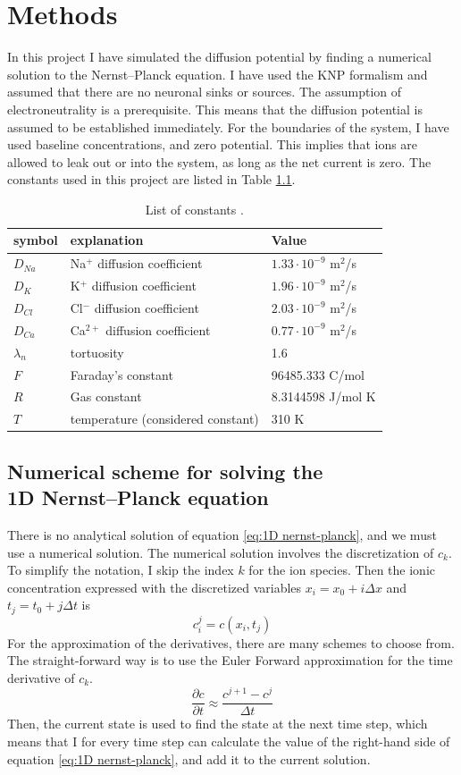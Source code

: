 \documentclass{uiophd}
\begin{document}
\chapter{Methods}
In this project I have  simulated the diffusion potential by finding a numerical solution to the Nernst--Planck equation. I have used the KNP formalism and assumed that there are no neuronal sinks or sources. The assumption of electroneutrality is a prerequisite. This means that the diffusion potential is assumed to be established immediately. For the boundaries of the system, I have used baseline concentrations, and zero potential. This implies that ions are allowed to leak out or into the system, as long as the net current is zero. The constants used in this project are listed in Table \ref{tab:constants}.
\begin{table}[h!]
  \centering
  \caption{List of constants \cite{Halnes2016}.}
  \label{tab:constants}
  \begin{tabular}{l||l|l}
symbol & explanation & Value \\
\hline
$D_{Na}$  & Na$^+$ diffusion coefficient & $1.33\cdot 10^{-9}$ m$^2$/s  \\
$D_{K}$  & K$^+$ diffusion coefficient & $1.96\cdot 10^{-9}$ m$^2$/s   \\
$D_{Cl}$  & Cl$^-$ diffusion coefficient & $2.03\cdot 10^{-9}$ m$^2$/s   \\
$D_{Ca}$  & Ca$^{2+}$ diffusion coefficient & $0.77\cdot 10^{-9}$ m$^2$/s   \\
$\lambda_n$ & tortuosity & 1.6 \\
$F$ & Faraday's constant & 	96485.333 C/mol \\ 
$R$ & Gas constant & 8.3144598 J/mol K\\
$T$ & temperature (considered constant)& 310 K\\

 \end{tabular}
\end{table}

\section{Numerical scheme for solving the \\1D Nernst--Planck equation}\label{Numerical scheme}

There is no analytical solution of equation \ref{eq:1D nernst-planck}, and we must use a numerical solution. The numerical solution involves the discretization of $c_k$. To simplify the notation, I skip the index $k$ for the ion species. Then the ionic concentration expressed with the discretized variables $x_i = x_0 +i \Delta x$ and $t_j = t_0 + j \Delta t$ is 
$$c_i^j = c(x_i, t_j)$$
For the approximation of the derivatives, there are many schemes to choose from. The straight-forward way is to use the Euler Forward approximation for the time derivative of $c_k$.
$$\frac{\partial c}{\partial t} \approx \frac{c^{j+1}-c^j}{\Delta t}$$
Then, the current state is used to find the state at the next time step, which means that I for every time step can calculate the value of the right-hand side of equation \ref{eq:1D nernst-planck}, and add it to the current solution. 
\end{document}
